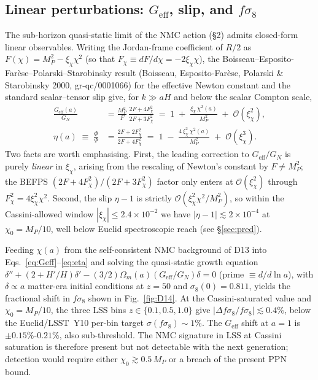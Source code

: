 
\subsection{Linear perturbations: $G_{\mathrm{eff}}$, slip, and $f\sigma_8$}
\label{subsec:perturb}

The sub-horizon quasi-static limit of the NMC action (\S2)
admits closed-form linear observables. Writing the Jordan-frame coefficient
of $R/2$ as $F(\chi)=M_P^2-\xi_\chi\chi^2$ (so that $F_\chi\equiv dF/d\chi =
-2\xi_\chi\chi$), the Boisseau--Esposito-Far\`ese--Polarski--Starobinsky
result (Boisseau, Esposito-Far\`ese, Polarski \& Starobinsky 2000, gr-qc/0001066) for the effective Newton constant and the standard
scalar--tensor slip give, for $k\gg aH$ and below the scalar Compton scale,
%
\begin{align}
\frac{G_{\mathrm{eff}}(a)}{G_N}
  &= \frac{M_P^2}{F}\,\frac{2F+4F_\chi^2}{2F+3F_\chi^2}
   \;=\; 1 \;+\; \frac{\xi_\chi\,\chi^2(a)}{M_P^2} \;+\; \mathcal O\!\left(\xi_\chi^2\right),
   \label{eq:Geff}\\[2pt]
\eta(a)\;\equiv\;\frac{\Phi}{\Psi}
  &= \frac{2F+2F_\chi^2}{2F+4F_\chi^2}
   \;=\; 1 \;-\; \frac{4\,\xi_\chi^2\,\chi^2(a)}{M_P^2} \;+\; \mathcal O\!\left(\xi_\chi^3\right).
   \label{eq:eta}
\end{align}
%
Two facts are worth emphasising. First, the leading correction to
$G_{\mathrm{eff}}/G_N$ is purely \emph{linear} in $\xi_\chi$, arising from
the rescaling of Newton's constant by $F\ne M_P^2$; the BEFPS
$(2F\!+\!4F_\chi^2)/(2F\!+\!3F_\chi^2)$ factor only enters at
$\mathcal O(\xi_\chi^2)$ through $F_\chi^2=4\xi_\chi^2\chi^2$. Second, the
slip $\eta-1$ is strictly $\mathcal O(\xi_\chi^2\chi^2/M_P^2)$, so within
the Cassini-allowed window $|\xi_\chi|\leq 2.4\times10^{-2}$ we have
$|\eta-1|\lesssim 2\times10^{-4}$ at $\chi_0=M_P/10$, well below Euclid
spectroscopic reach (see \S\ref{sec:pred}).

Feeding $\chi(a)$ from the self-consistent NMC background of D13 into
Eqs.~\eqref{eq:Geff}--\eqref{eq:eta} and solving the quasi-static growth
equation $\delta''+(2+H'/H)\delta'-(3/2)\Omega_m(a)(G_{\mathrm{eff}}/G_N)\delta=0$
(prime $\equiv d/d\ln a$), with $\delta\propto a$ matter-era initial
conditions at $z=50$ and $\sigma_8(0)=0.811$, yields the fractional shift
in $f\sigma_8$ shown in Fig.~\ref{fig:D14}. At the Cassini-saturated value
and $\chi_0=M_P/10$, the three LSS bins $z\in\{0.1,0.5,1.0\}$ give
$|\Delta f\sigma_8/f\sigma_8|\lesssim 0.4\%$, below the Euclid/LSST~Y10
per-bin target $\sigma(f\sigma_8)\sim 1\%$. The $G_{\mathrm{eff}}$ shift at
$a=1$ is $\pm 0.15\%$-$0.21\%$, also sub-threshold. The NMC signature in
LSS at Cassini saturation is therefore present but not detectable with the
next generation; detection would require either $\chi_0\gtrsim 0.5\,M_P$ or
a breach of the present PPN bound.

